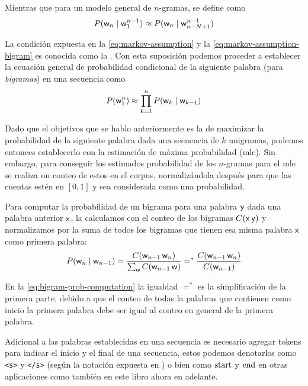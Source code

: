 Mientras que para un modelo general de $n$-gramas, se define como
\begin{equation} \label{eq:markov-assumption}
  P({\mathit{\mathsf{w}}}_n \mid {\mathit{\mathsf{w}}}_1^{n-1}) \approx P({\mathit{\mathsf{w}}}_n \mid {\mathit{\mathsf{w}}}_{n-N+1}^{n-1})
\end{equation}

La condición expuesta en la \cref{eq:markov-assumption} y la \cref{eq:markov-assumption-bigram} es conocida como la . Con esta suposición podemos proceder a establecer la ecuación general de probabilidad condicional de la siguiente palabra (para \textit{bigramas}) en una secuencia como
\begin{equation}
  P({\mathit{\mathsf{w}}}_1^{n}) \approx \prod_{k=1}^{n} P({\mathit{\mathsf{w}}}_k \mid {\mathit{\mathsf{w}}}_{k-1})
\end{equation}

Dado que el objetivos que se hablo anteriormente es la de maximizar la probabilidad de la siguiente palabra dada una secuencia de $k$ unigramas, podemos entonces establecerlo con la estimación de máxima probabilidad (\gls{mle}). Sin embargo, para conseguir los estimados probabilidad de los $n$-gramas para el \gls{mle} se realiza un conteo de estos en el \gls{corpus}, normalizándola después para que las cuentas estén en $[0, 1]$ y sea considerada como una probabilidad.

Para computar la probabilidad de un bigrama para una palabra ${\mathit{\mathsf{y}}}$ dada una palabra anterior ${\mathit{\mathsf{x}}}$, la calculamos con el conteo de los bigramas $C({\mathit{\mathsf{x}}} \, {\mathit{\mathsf{y}}})$ y normalizamos por la suma de todos los bigramas que tienen esa misma palabra ${\mathit{\mathsf{x}}}$ como primera palabra:
\begin{equation} \label{eq:bigram-prob-computation}
  P({\mathit{\mathsf{w}}}_n \mid {\mathit{\mathsf{w}}}_{n-1}) = \frac{C( {\mathit{\mathsf{w}}}_{n-1} \, {\mathit{\mathsf{w}}}_{n})}{ \sum_{\mathit{\mathsf{w}}} C({\mathit{\mathsf{w}}}_{n-1} \, {\mathit{\mathsf{w}}}) } =^{\ast} \frac{C( {\mathit{\mathsf{w}}}_{n-1} \, {\mathit{\mathsf{w}}}_{n})}{ C({\mathit{\mathsf{w}}}_{n-1}) }
\end{equation}

En la \cref{eq:bigram-prob-computation} la igualdad $=^{\ast}$ es la simplificación de la primera parte, debido a que el conteo de todas la palabras que contienen como inicio la primera palabra debe ser igual al conteo en general de la primera palabra.

Adicional a las palabras establecidas en una secuencia es necesario agregar tokens para indicar el inicio y el final de una secuencia, estos podemos denotarlos como \texttt{<s>} y \texttt{</s>} (según la notación expuesta en \cite{jurafsky-martin}) o bien como $\mathrm{start}$ y $\mathrm{end}$ en otras aplicaciones como también en este libro ahora en adelante.

